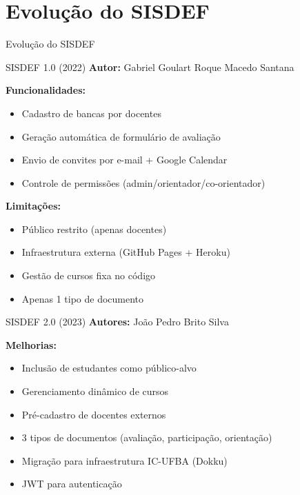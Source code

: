 \documentclass[aspectratio=169,xcolor=table]{beamer}
\begin{document}
\section{Evolução do SISDEF}

\begin{frame}[plain]
    \begin{center}
        \Huge Evolução do SISDEF
    \end{center}
\end{frame}

\begin{frame}{SISDEF 1.0 (2022)}
    \textbf{Autor:} Gabriel Goulart Roque Macedo Santana
    
    \vspace{0.5em}
    \textbf{Funcionalidades:}
    \begin{itemize}
        \item Cadastro de bancas por docentes
        \item Geração automática de formulário de avaliação
        \item Envio de convites por e-mail + Google Calendar
        \item Controle de permissões (admin/orientador/co-orientador)
    \end{itemize}
    
    \vspace{0.5em}
    \textbf{Limitações:}
    \begin{itemize}
        \item Público restrito (apenas docentes)
        \item Infraestrutura externa (GitHub Pages + Heroku)
        \item Gestão de cursos fixa no código
        \item Apenas 1 tipo de documento
    \end{itemize}
\end{frame}

\begin{frame}{SISDEF 2.0 (2023)}
    \textbf{Autores:} João Pedro Brito Silva
    
    \vspace{0.5em}
    \textbf{Melhorias:}
    \begin{itemize}
        \item Inclusão de estudantes como público-alvo
        \item Gerenciamento dinâmico de cursos
        \item Pré-cadastro de docentes externos
        \item 3 tipos de documentos (avaliação, participação, orientação)
        \item Migração para infraestrutura IC-UFBA (Dokku)
        \item JWT para autenticação
    \end{itemize}
\end{frame}
\end{document}
